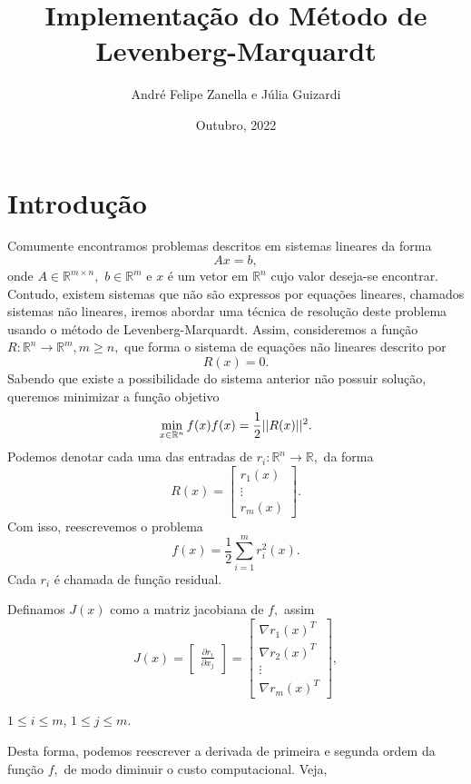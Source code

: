 \documentclass[12pt,a4paper]{article}
\author{André Felipe Zanella e Júlia Guizardi}
\title{Implementação do Método de Levenberg-Marquardt}
\date{Outubro, 2022}
\newcounter{ex}[section]
\begin{document}
	\maketitle
	\section{Introdução}\label{intro}
	Comumente encontramos problemas descritos em sistemas lineares da forma $$Ax = b,$$
	onde $A \in \mathbb{R}^{m\times n},$ $b \in \mathbb{R}^m$ e $x$ é um vetor em $\mathbb{R}^n$ cujo valor deseja-se encontrar.
	Contudo, existem sistemas que não são expressos por equações lineares, chamados sistemas não lineares, iremos abordar uma técnica de resolução deste problema usando o método de Levenberg-Marquardt. Assim, consideremos a função $R: \mathbb{R}^n \longrightarrow \mathbb{R}^m, m\geq n,$ que forma o sistema de equações não lineares descrito por $$R(x)=0.$$
	Sabendo que existe a possibilidade do sistema anterior não possuir solução, queremos minimizar a função objetivo
	\begin{equation}\label{qmnl}
	\min_{x \in \mathbb{R}^{n}} f(x) 
	\\	
	f(x) = \frac{1}{2}||R(x)||^2.
	\end{equation}
	Podemos denotar cada uma das entradas de $r_i:\mathbb{R}^n\longrightarrow \mathbb{R},$ da forma
	$$R(x)=\begin{bmatrix}
	r_1(x)\\ \vdots \\ r_m(x)
	\end{bmatrix}.$$ Com isso, reescrevemos o problema \begin{equation}
	f(x) = \frac{1}{2}\sum_{i=1}^{m}r_i^2(x).
	\end{equation}
	Cada $r_i$ é chamada de função residual.
	
	Definamos $J(x)$ como a matriz jacobiana de $f,$ assim
	\[
	J (x) =
	\begin{bmatrix}
	\frac{\partial{r_i}}{\partial{x_j}}
	\end{bmatrix}
	=
	\begin{bmatrix}
	\nabla r_1(x)^{T} \\
	\nabla r_2(x)^{T} \\
	\vdots \\
	\nabla r_m(x)^{T}
	\end{bmatrix}
	,
	\]

	$1 \leq i \leq m$, $1 \leq j \leq m$.
		
	Desta forma, podemos reescrever a derivada de primeira e segunda ordem da função $f,$ de modo diminuir o custo computacional. Veja,
	
\end{document}
